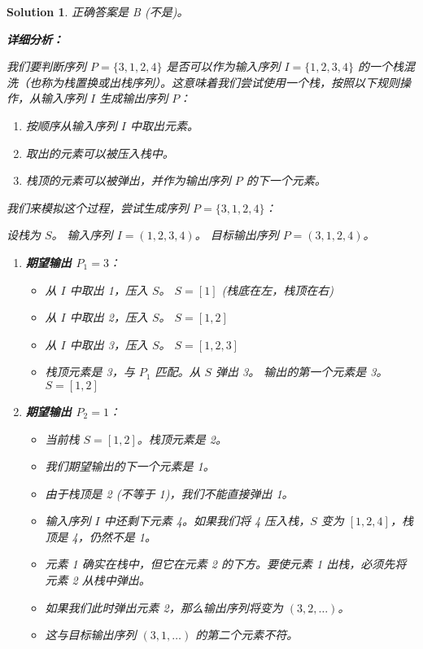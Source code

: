 \documentclass[UTF8]{report}
\newtheorem{solution}{Solution}
\theoremstyle{MyLineTheoremStyle} %
\theoremstyle{MyBlockTheoremStyle} %
\theoremstyle{MySubsubsectionStyle} %
\begin{document}
\begin{solution}
正确答案是 B (不是)。

\textbf{详细分析：}

我们要判断序列 $P = \{3,1,2,4\}$ 是否可以作为输入序列 $I = \{1,2,3,4\}$ 的一个栈混洗（也称为栈置换或出栈序列）。这意味着我们尝试使用一个栈，按照以下规则操作，从输入序列 $I$ 生成输出序列 $P$：
\begin{enumerate}
    \item 按顺序从输入序列 $I$ 中取出元素。
    \item 取出的元素可以被压入栈中。
    \item 栈顶的元素可以被弹出，并作为输出序列 $P$ 的下一个元素。
\end{enumerate}

我们来模拟这个过程，尝试生成序列 $P = \{3,1,2,4\}$：

设栈为 $S$。
输入序列 $I = (1, 2, 3, 4)$。
目标输出序列 $P = (3, 1, 2, 4)$。

\begin{enumerate}
    \item \textbf{期望输出 $P_1 = 3$}：
    \begin{itemize}
        \item 从 $I$ 中取出 1，压入 $S$。 $S = [1]$ (栈底在左，栈顶在右)
        \item 从 $I$ 中取出 2，压入 $S$。 $S = [1, 2]$
        \item 从 $I$ 中取出 3，压入 $S$。 $S = [1, 2, 3]$
        \item 栈顶元素是 3，与 $P_1$ 匹配。从 $S$ 弹出 3。
              \quad 输出的第一个元素是 3。
              \quad $S = [1, 2]$
    \end{itemize}

    \item \textbf{期望输出 $P_2 = 1$}：
    \begin{itemize}
        \item 当前栈 $S = [1, 2]$。栈顶元素是 2。
        \item 我们期望输出的下一个元素是 1。
        \item 由于栈顶是 2 (不等于 1)，我们不能直接弹出 1。
        \item 输入序列 $I$ 中还剩下元素 4。如果我们将 4 压入栈，$S$ 变为 $[1, 2, 4]$，栈顶是 4，仍然不是 1。
        \item 元素 1 确实在栈中，但它在元素 2 的下方。要使元素 1 出栈，必须先将元素 2 从栈中弹出。
        \item 如果我们此时弹出元素 2，那么输出序列将变为 $(3, 2, \ldots)$。
        \item 这与目标输出序列 $(3, 1, \ldots)$ 的第二个元素不符。
    \end{itemize}
\end{enumerate}


\end{solution}
\end{document}
